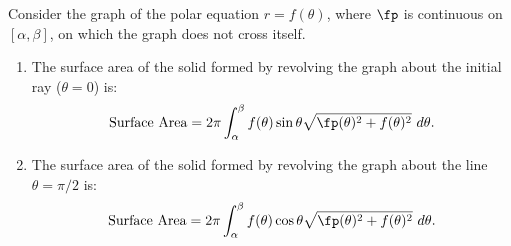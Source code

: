{Consider the graph of the polar equation $r=f(\theta)$, where $\fp$ is continuous on  $[\alpha,\beta]$, on which the graph does not cross itself.
	\begin{enumerate}
		\item The surface area of the solid formed by revolving the graph about the initial ray ($\theta=0$) is:
		$$\text{Surface Area} = 2\pi\int_\alpha^\beta f(\theta)\sin\theta\sqrt{\fp(\theta)^2+f(\theta)^2}\ d\theta.$$
		\item The surface area of the solid formed by revolving the graph about the line $\theta=\pi/2$ is:
		$$\text{Surface Area} = 2\pi\int_\alpha^\beta f(\theta)\cos\theta\sqrt{\fp(\theta)^2+f(\theta)^2}\ d\theta.$$
	\end{enumerate}
}
\clearpage

